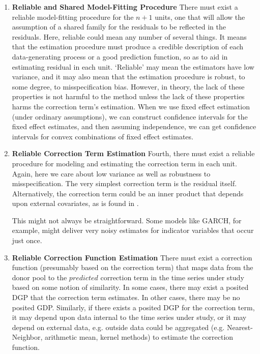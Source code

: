 \documentclass[11pt]{article}
\theoremstyle{definition}
\begin{document}
\begin{enumerate}
\item \textbf{Reliable and Shared Model-Fitting Procedure} There must exist a reliable model-fitting procedure for the $n+1$ units, one that will allow the assumption of a shared family for the residuals to be reflected in the residuals.  Here, reliable could mean any number of several things.  It means that the estimation procedure must produce a credible description of each data-generating process or a good prediction function, so as to aid in estimating residual in each unit.  `Reliable' may mean the estimators have low variance, and it may also mean that the estimation procedure is robust, to some degree, to misspecification bias.  However, in theory, the lack of these properties is not harmful to the method unless the lack of these properties harms the correction term's estimation.  When we use fixed effect estimation (under ordinary assumptions), we can construct confidence intervals for the fixed effect estimates, and then assuming independence, we can get confidence intervals for convex combinations of fixed effect estimates.

\item \textbf{Reliable Correction Term Estimation} Fourth, there must exist a reliable procedure for modeling and estimating the correction term in each unit.  Again, here we care about low variance as well as robustness to misspecification.  The very simplest correction term is the residual itself.  Alternatively, the correction term could be an inner product that depends upon external covariates, as is found in \cite{lin2021minimizing,lundquist2024volatility}.

This might not always be straightforward.  Some models like GARCH, for example, might deliver very noisy estimates for indicator variables that occur just once.

\item \textbf{Reliable Correction Function Estimation} There must exist a correction function (presumably based on the correction term) that maps data from the donor pool to the $\textit{predicted}$ correction term in the time series under study based on some notion of similarity.  In some cases, there may exist a posited DGP that the correction term estimates.  In other cases, there may be no posited GDP.  Similarly, if there exists a posited DGP for the correction term, it may depend upon data internal to the time series under study, or it may depend on external data, e.g. outside data could be aggregated (e.g. Nearest-Neighbor, arithmetic mean, kernel methods) to estimate the correction function.

\end{enumerate}
\end{document}
